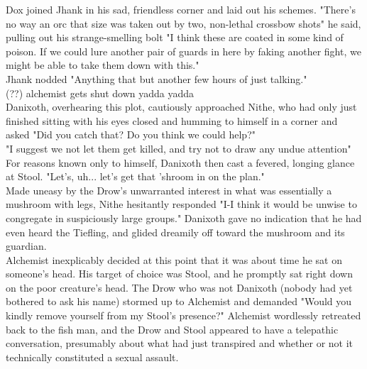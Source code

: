 \documentclass[letterpaper,10pt,twoside,twocolumn,openany]{book}
\begin{document}
Dox joined Jhank in his sad, friendless corner and laid out his schemes. "There's no way an orc that size was taken out by two, non-lethal crossbow shots" he said, pulling out his strange-smelling bolt "I think these are coated in some kind of poison. If we could lure another pair of guards in here by faking another fight, we might be able to take them down with this."\\
Jhank nodded "Anything that but another few hours of just talking."\\

(??) alchemist gets shut down yadda yadda\\

Danixoth, overhearing this plot, cautiously approached Nithe, who had only just finished sitting with his eyes closed and humming to himself in a corner and asked "Did you catch that? Do you think we could help?"\\
"I suggest we not let them get killed, and try not to draw any undue attention"\\
For reasons known only to himself, Danixoth then cast a fevered, longing glance at Stool. "Let's, uh... let's get that 'shroom in on the plan."\\
Made uneasy by the Drow's unwarranted interest in what was essentially a mushroom with legs, Nithe hesitantly responded "I-I think it would be unwise to congregate in suspiciously large groups."
Danixoth gave no indication that he had even heard the Tiefling, and glided dreamily off toward the mushroom and its guardian.\\

Alchemist inexplicably decided at this point that it was about time he sat on someone's head. His target of choice was Stool, and he promptly sat right down on the poor creature's head. The Drow who was not Danixoth (nobody had yet bothered to ask his name) stormed up to Alchemist and demanded "Would you kindly remove yourself from my Stool's presence?" Alchemist wordlessly retreated back to the fish man, and the Drow and Stool appeared to have a telepathic conversation, presumably about what had just transpired and whether or not it technically constituted a sexual assault.\\
\end{document}
